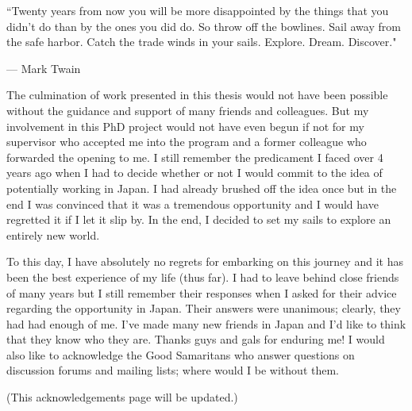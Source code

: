 \epigraph{``Twenty years from now you will be more disappointed by the things that you didn't do than by the ones you did do. So throw off the bowlines. Sail away from the safe harbor. Catch the trade winds in your sails. Explore. Dream. Discover."}{--- \textup{Mark Twain}}

The culmination of work presented in this thesis would not have been possible without the guidance and support of many friends and colleagues. But my involvement in this PhD project would not have even begun if not for my supervisor who accepted me into the program and a former colleague who forwarded the opening to me. I still remember the predicament I faced over 4 years ago when I had to decide whether or not I would commit to the idea of potentially working in Japan. I had already brushed off the idea once but in the end I was convinced that it was a tremendous opportunity and I would have regretted it if I let it slip by. In the end, I decided to set my sails to explore an entirely new world.

To this day, I have absolutely no regrets for embarking on this journey and it has been the best experience of my life (thus far). I had to leave behind close friends of many years but I still remember their responses when I asked for their advice regarding the opportunity in Japan. Their answers were unanimous; clearly, they had had enough of me. I've made many new friends in Japan and I'd like to think that they know who they are. Thanks guys and gals for enduring me! I would also like to acknowledge the Good Samaritans who answer questions on discussion forums and mailing lists; where would I be without them.

(This acknowledgements page will be updated.)
